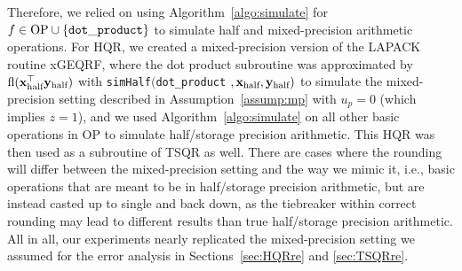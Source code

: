 Therefore, we relied on using Algorithm~\ref{algo:simulate} for $f\in \text{OP} \cup\{{\tt dot\_product}\}$ to simulate half and mixed-precision arithmetic operations. 
For HQR, we created a mixed-precision version of the LAPACK routine xGEQRF, where the dot product subroutine was approximated by $\mathrm{fl}(\mathbf{x}_{\text{half}}^{\top}\mathbf{y}_{\text{half}})$ with {\tt simHalf}$(${\tt dot\_product} $, \mathbf{x}_{\text{half}}, \mathbf{y}_{\text{half}})$ to simulate the mixed-precision setting described in Assumption~\ref{assump:mp} with $u_p = 0$ (which implies $z=1$), and we used Algorithm~\ref{algo:simulate} on all other basic operations in OP to simulate half/storage precision arithmetic. 
This HQR was then used as a subroutine of TSQR as well. 
There are cases where the rounding will differ between the mixed-precision setting and the way we mimic it, i.e., basic operations that are meant to be in half/storage precision arithmetic, but are instead casted up to single and back down, as the tiebreaker within correct rounding may lead to different results than true half/storage precision arithmetic. 
All in all, our experiments nearly replicated the mixed-precision setting we assumed for the error analysis in Sections~\ref{sec:HQRre} and \ref{sec:TSQRre}.\par 
